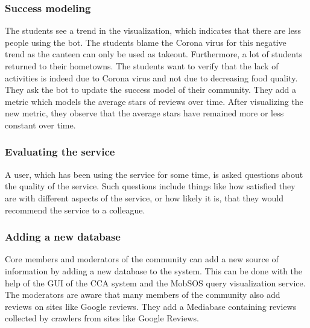 \subsubsection{Success modeling} The students see a trend in the visualization, which indicates that there are less people using the bot.
The students blame the Corona virus for this negative trend as the canteen can only be used as takeout. Furthermore, a lot of students returned to their hometowns.
The students want to verify that the lack of activities is indeed due to Corona virus and not due to decreasing food quality.
They ask the bot to update the success model of their community.
They add a metric which models the average stars of reviews over time.
After visualizing the new metric, they observe that the average stars have remained more or less constant over time.




\subsubsection{Evaluating the service} A user, which has been using the service for some time, is asked questions about the quality of the service. Such questions include things like how satisfied they are with different aspects of the service, or how likely it is, that they would recommend the service to a colleague.

\subsubsection{Adding a new database} Core members and moderators of the community can add a new source of information by adding a new database to the system. This can be done with the help of the GUI of the CCA system and the MobSOS query visualization service.
The moderators are aware that many members of the community also add reviews on sites like Google reviews. 
They add a Mediabase containing reviews collected by crawlers from sites like Google Reviews.

